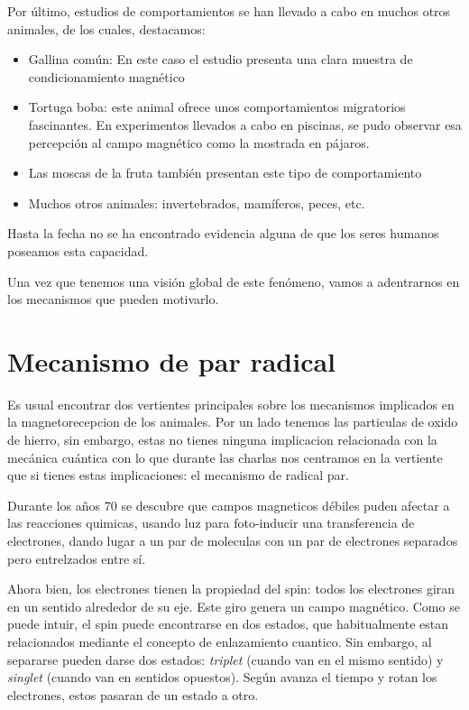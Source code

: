 \documentclass[1p]{elsarticle}
\begin{document}
Por último, estudios de comportamientos se han llevado a cabo en muchos otros animales, de los cuales, destacamos: 
\begin{itemize}
	\item Gallina común: En este caso el estudio presenta una clara muestra de condicionamiento magnético
	\item Tortuga boba: este animal ofrece unos comportamientos migratorios fascinantes. En experimentos llevados a cabo en piscinas, se pudo observar esa percepción al campo magnético como la mostrada en pájaros.\cite{lohmann1991magnetic}
	\item Las moscas de la fruta también presentan este tipo de comportamiento \cite{cromomosca}
	\item Muchos otros animales: invertebrados, mamíferos, peces, etc.\cite{palomas,bee,anderson1993magnetic,vacha2009radio}
\end{itemize}

Hasta la fecha no se ha encontrado evidencia alguna de que los seres humanos poseamos esta capacidad.

Una vez que tenemos una visión global de este fenómeno, vamos a adentrarnos en los mecanismos que pueden motivarlo.


\section{Mecanismo de par radical}
Es usual encontrar dos vertientes principales sobre los mecanismos implicados en la magnetorecepcion de los animales.
Por un lado tenemos las particulas de oxido de hierro, sin embargo, estas no tienes ninguna implicacion relacionada con la mecánica cuántica con lo que durante las charlas nos centramos en la vertiente que si tienes estas implicaciones: el mecanismo de radical par.

Durante los años 70 se descubre que campos magneticos débiles puden afectar a las reacciones quimicas, usando luz para  foto-inducir una transferencia de electrones, dando lugar a un par de moleculas con un par de electrones separados pero entrelzados entre sí.

Ahora bien, los electrones tienen la propiedad del spin: todos los electrones giran en un sentido alrededor de su eje. Este giro genera un campo magnético. Como se puede intuir, el spin puede encontrarse en dos estados, que habitualmente estan relacionados mediante el concepto de enlazamiento cuantico. Sin embargo, al separarse pueden darse dos estados: \textit{triplet} (cuando van en el mismo sentido) y \textit{singlet} (cuando van en sentidos opuestos). Según avanza el tiempo y rotan los electrones, estos pasaran de un estado a otro.
\end{document}
